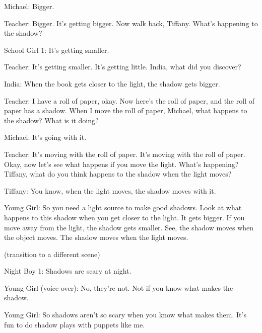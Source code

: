 Michael: Bigger.

Teacher: Bigger. It's getting bigger. Now walk back, Tiffany. What's happening to the shadow?

School Girl 1: It's getting smaller.

Teacher: It's getting smaller. It's getting little. India, what did you discover?

India: When the book gets closer to the light, the shadow gets bigger.

Teacher: I have a roll of paper, okay. Now here's the roll of paper, and the roll of paper has a shadow. When I move the roll of paper, Michael, what happens to the shadow? What is it doing?

Michael: It's going with it.

Teacher: It's moving with the roll of paper. It's moving with the roll of paper. Okay, now let's see what happens if you move the light. What's happening? Tiffany, what do you think happens to the shadow when the light moves?

Tiffany: You know, when the light moves, the shadow moves with it.

Young Girl: So you need a light source to make good shadows. Look at what happens to this shadow when you get closer to the light. It gets bigger. If you move away from the light, the shadow gets smaller. See, the shadow moves when the object moves. The shadow moves when the light moves.

(transition to a different scene)

Night Boy 1: Shadows are scary at night.

Young Girl (voice over): No, they're not. Not if you know what makes the shadow.

Young Girl: So shadows aren't so scary when you know what makes them. It's fun to do shadow plays with puppets like me.

